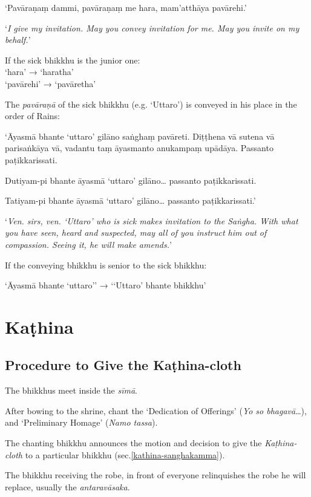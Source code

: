 ‘Pavāraṇaṃ dammi, pavāraṇaṃ me hara, mam'atthāya pavārehi.’

‘\emph{I give my invitation. May you convey invitation for me. May you invite on
  my behalf.}’


If the sick bhikkhu is the junior one:\\
‘hara’ → ‘haratha’\\
‘pavārehi’ → ‘pavāretha’

The \emph{pavāraṇā} of the sick bhikkhu (e.g. ‘Uttaro’) is conveyed in his place
in the order of Rains:

‘Āyasmā bhante ‘uttaro’ gilāno saṅghaṃ pavāreti. Diṭṭhena vā sutena vā
parisaṅkāya vā, vadantu taṃ āyasmanto anukampaṃ upādāya. Passanto
paṭikkarissati.

Dutiyam-pi bhante āyasmā ‘uttaro’ gilāno… passanto paṭikkarissati.

Tatiyam-pi bhante āyasmā ‘uttaro’ gilāno… passanto paṭikkarissati.’

‘\emph{Ven. sirs, ven. ‘Uttaro’ who is sick makes invitation to the Saṅgha. With
  what you have seen, heard and suspected, may all of you instruct him out of
  compassion. Seeing it, he will make amends.}’

If the conveying bhikkhu is senior to the sick bhikkhu:

‘Āyasmā bhante ‘uttaro’’ → ‘‘Uttaro’ bhante bhikkhu’


\section{Kaṭhina}

\subsection{Procedure to Give the Kaṭhina-cloth}

The bhikkhus meet inside the \emph{sīmā}.

After bowing to the shrine, chant the `Dedication of Offerings' (\emph{Yo so
  bhagavā}\ldots), and `Preliminary Homage' (\emph{Namo tassa}).

The chanting bhikkhu announces the motion and decision to give the
\emph{Kaṭhina-cloth} to a particular bhikkhu (sec.\ref{kathina-sanghakamma}).

The bhikkhu receiving the robe, in front of everyone relinquishes the robe he
will replace, usually the \emph{antaravāsaka}.

